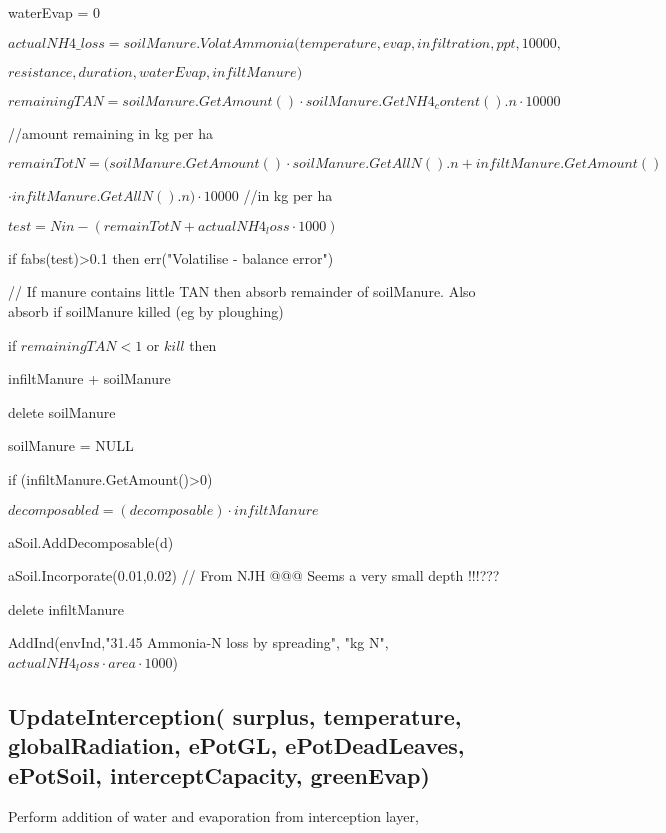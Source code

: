 \documentclass[%
]{scrartcl}
\begin{document}
{{{   waterEvap = 0
     
$ actualNH4\_loss=soilManure.VolatAmmonia(temperature, evap, infiltration, ppt, 10000, $

$resistance, duration, waterEvap, infiltManure)$

        $remainingTAN = soilManure.GetAmount() \cdot soilManure.GetNH4_content().n \cdot 10000$
        
        //amount remaining in kg per ha
        
        $remainTotN=(soilManure.GetAmount() \cdot soilManure.GetAllN().n + infiltManure.GetAmount()$ 

$\cdot infiltManure.GetAllN().n) \cdot 10000$  //in kg per ha
      
  $test = Nin-(remainTotN+actualNH4_loss \cdot 1000)$
  
    if fabs(test)>0.1 then
            err("Volatilise - balance error")

    // If manure contains little TAN then absorb remainder of soilManure. Also absorb if soilManure killed (eg by ploughing)
    
  if $remainingTAN<1$ or $kill$ then
      
      \quad 	 infiltManure +   soilManure
    
      \quad    delete soilManure
    
      \quad    soilManure = NULL
      

      if (infiltManure.GetAmount()>0)
      
       \quad   $decomposable d=(decomposable)  \cdot infiltManure$
       
        \quad  aSoil.AddDecomposable(d)
        
         \quad aSoil.Incorporate(0.01,0.02)  // From NJH @@@ Seems a very small depth !!!???
      
   \quad delete infiltManure
      
   
   
   AddInd(envInd,"31.45 Ammonia-N loss by spreading",
"kg N",$actualNH4_loss  \cdot  area  \cdot 1000$)



\subsection{UpdateInterception(  surplus,
  temperature,  globalRadiation, ePotGL,
 ePotDeadLeaves, ePotSoil,  interceptCapacity,  greenEvap)}
																 Perform addition of water and evaporation from interception layer,

}}}
\end{document}
